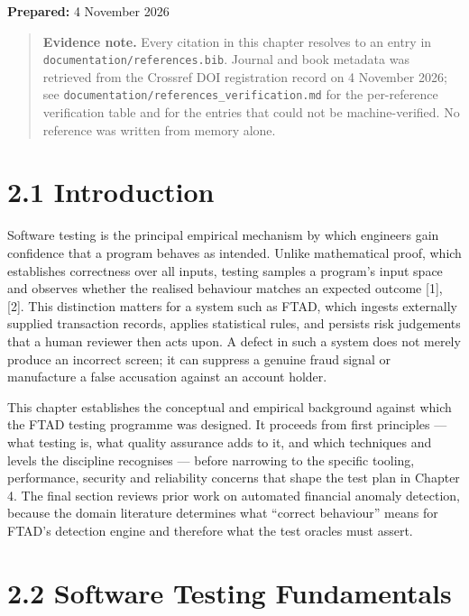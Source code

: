 \documentclass[
  12pt,
]{report}
\begin{document}
\textbf{Prepared:} 4 November 2026

\begin{quote}
\textbf{Evidence note.} Every citation in this chapter resolves to an
entry in \texttt{documentation/\allowbreak{}references.bib}. Journal and book
metadata was retrieved from the Crossref DOI registration record on 4
November 2026; see \texttt{documentation/\allowbreak{}references\_verification.md}
for the per-reference verification table and for the entries that could
not be machine-verified. No reference was written from memory alone.
\end{quote}

\section{2.1 Introduction}\label{introduction-1}

Software testing is the principal empirical mechanism by which engineers
gain confidence that a program behaves as intended. Unlike mathematical
proof, which establishes correctness over all inputs, testing samples a
program's input space and observes whether the realised behaviour
matches an expected outcome {[}1{]}, {[}2{]}. This distinction matters
for a system such as FTAD, which ingests externally supplied transaction
records, applies statistical rules, and persists risk judgements that a
human reviewer then acts upon. A defect in such a system does not merely
produce an incorrect screen; it can suppress a genuine fraud signal or
manufacture a false accusation against an account holder.

This chapter establishes the conceptual and empirical background against
which the FTAD testing programme was designed. It proceeds from first
principles --- what testing is, what quality assurance adds to it, and
which techniques and levels the discipline recognises --- before
narrowing to the specific tooling, performance, security and reliability
concerns that shape the test plan in Chapter 4. The final section
reviews prior work on automated financial anomaly detection, because the
domain literature determines what ``correct behaviour'' means for FTAD's
detection engine and therefore what the test oracles must assert.

\section{2.2 Software Testing
Fundamentals}\label{software-testing-fundamentals}
\end{document}
